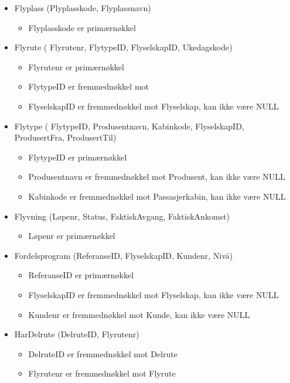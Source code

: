 \documentclass[a4paper,12pt]{article}
\begin{document}
\begin{itemize}
\item Flyplass (Plyplasskode, Flyplassnavn)
\begin{itemize}
\item Flyplasskode er primærnøkkel
\end{itemize}

\item Flyrute ( Flyrutenr, FlytypeID, FlyselskapID, Ukedagskode)
\begin{itemize}
\item Flyrutenr er primærnøkkel
\item FlytypeID er fremmednøkkel mot
\item FlyselskapID er fremmednøkkel mot Flyselskap, kan ikke være NULL
\end{itemize}

\item Flytype ( FlytypeID, Produsentnavn, Kabinkode, FlyselskapID, ProdusertFra, ProdusertTil)
\begin{itemize}
\item FlytypeID er primærnøkkel
\item Produsentnavn er fremmednøkkel mot Produsent, kan ikke være NULL
\item Kabinkode er fremmednøkkel mot Passasjerkabin, kan ikke være NULL
\end{itemize}

\item Flyvning (Løpenr, Status, FaktiskAvgang, FaktiskAnkomst)
\begin{itemize}
\item Løpenr er primærnøkkel
\end{itemize}

\item Fordelsprogram (ReferanseID, FlyselskapID, Kundenr, Nivå)
\begin{itemize}
\item ReferanseID er primærnøkkel
\item FlyselskapID er fremmednøkkel mot Flyselskap, kan ikke være NULL
\item Kundenr er fremmednøkkel mot Kunde, kan ikke være NULL
\end{itemize}

\item HarDelrute (DelruteID, Flyrutenr)
\begin{itemize}
\item DelruteID er fremmednøkkel mot Delrute
\item Flyrutenr er fremmednøkkel mot Flyrute
\end{itemize}


\end{itemize}
\end{document}
